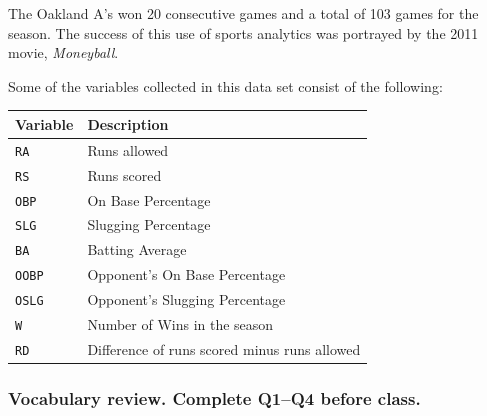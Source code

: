 \documentclass[
]{report}
\newenvironment{Shaded}{\begin{snugshade}}{\end{snugshade}}
\newcommand{\CommentTok}[1]{\textcolor[rgb]{0.56,0.35,0.01}{\textit{#1}}}
\newcommand{\DecValTok}[1]{\textcolor[rgb]{0.00,0.00,0.81}{#1}}
\newcommand{\KeywordTok}[1]{\textcolor[rgb]{0.13,0.29,0.53}{\textbf{#1}}}
\newcommand{\NormalTok}[1]{#1}
\newcommand{\OperatorTok}[1]{\textcolor[rgb]{0.81,0.36,0.00}{\textbf{#1}}}
\newcommand{\StringTok}[1]{\textcolor[rgb]{0.31,0.60,0.02}{#1}}
\begin{document}
The Oakland A's won 20 consecutive games and a total of 103 games for the season. The success of this use of sports analytics was portrayed by the 2011 movie, \emph{Moneyball}.

Some of the variables collected in this data set consist of the following:

\begin{longtable}[]{@{}ll@{}}
\toprule
\textbf{Variable} & \textbf{Description}\tabularnewline
\midrule
\endhead
\texttt{RA} & Runs allowed\tabularnewline
\texttt{RS} & Runs scored\tabularnewline
\texttt{OBP} & On Base Percentage\tabularnewline
\texttt{SLG} & Slugging Percentage\tabularnewline
\texttt{BA} & Batting Average\tabularnewline
\texttt{OOBP} & Opponent's On Base Percentage\tabularnewline
\texttt{OSLG} & Opponent's Slugging Percentage\tabularnewline
\texttt{W} & Number of Wins in the season\tabularnewline
\texttt{RD} & Difference of runs scored minus runs allowed\tabularnewline
\bottomrule
\end{longtable}

\begin{Shaded}
\end{Shaded}

\hypertarget{vocabulary-review.-complete-q1q4-before-class.-2}{%
\subsubsection*{Vocabulary review. Complete Q1--Q4 before class.}\label{vocabulary-review.-complete-q1q4-before-class.-2}}
\end{document}
